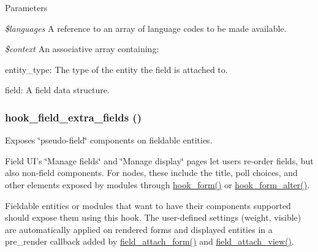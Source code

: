\begin{DoxyParams}{Parameters}
\item[{\em \$languages}]A reference to an array of language codes to be made available. \item[{\em \$context}]An associative array containing:
\begin{DoxyItemize}
\item entity\_\-type: The type of the entity the field is attached to.
\item field: A field data structure. 
\end{DoxyItemize}\end{DoxyParams}
\hypertarget{group__hooks_ga7100332aa5b4d5f6ba72534599d133e5}{
\subsubsection[{hook\_\-field\_\-extra\_\-fields}]{\setlength{\rightskip}{0pt plus 5cm}hook\_\-field\_\-extra\_\-fields ()}}
\label{group__hooks_ga7100332aa5b4d5f6ba72534599d133e5}
Exposes \char`\"{}pseudo-\/field\char`\"{} components on fieldable entities.

Field UI's \char`\"{}Manage fields\char`\"{} and \char`\"{}Manage display\char`\"{} pages let users re-\/order fields, but also non-\/field components. For nodes, these include the title, poll choices, and other elements exposed by modules through \hyperlink{group__node__api__hooks_ga52618ef4643a60878dd5a76ff9bbff30}{hook\_\-form()} or \hyperlink{group__hooks_ga6df3cea27ae1407aeef4eae5444cb213}{hook\_\-form\_\-alter()}.

Fieldable entities or modules that want to have their components supported should expose them using this hook. The user-\/defined settings (weight, visible) are automatically applied on rendered forms and displayed entities in a pre\_\-render callback added by \hyperlink{group__field__attach_gac5bd0213dae78f7c1b3235f3acdde2c6}{field\_\-attach\_\-form()} and \hyperlink{group__field__attach_gaa752a8fd31173fd2308d71eb059e00c7}{field\_\-attach\_\-view()}.

